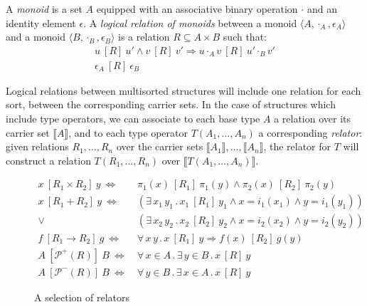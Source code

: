 \documentclass[acmsmall,timestamp,review]{acmart}
\newcommand{\ifr}[1]{\ [{#1}]\ }
\begin{document}
\begin{example}
\label{ex:monoid}
A \emph{monoid} is a set $A$ equipped with
an associative binary operation $\cdot$ and
an identity element $\epsilon$.
A \emph{logical relation of monoids} between
a monoid $\langle A, \cdot_A, \epsilon_A \rangle$ and
a monoid $\langle B, \cdot_B, \epsilon_B \rangle$
is a relation $R \subseteq A \times B$
such that:
\begin{gather*}
u \ifr{R} u' \wedge v \ifr{R} v' \Rightarrow u \cdot_A v \ifr{R} u' \cdot_B v' \\
\epsilon_A \ifr{R} \epsilon_B
\end{gather*}
\end{example}

Logical relations between multisorted structures
will include one relation for each sort,
between the corresponding carrier sets.
In the case of structures which include type operators,
we can associate to each base type $A$
a relation over its carrier set $\llbracket A \rrbracket$,
and to each type operator $T(A_1, \ldots, A_n)$
a corresponding \emph{relator}:
given relations $R_1, \ldots, R_n$ over
the carrier sets $\llbracket A_1 \rrbracket, \ldots, \llbracket A_n \rrbracket$,
the relator for $T$
will construct a relation $T(R_1, \ldots, R_n)$
over $\llbracket T(A_1, \ldots, A_n) \rrbracket$.

\begin{figure} %
  {\small
  \begin{align*}
    x \ifr{R_1 \times R_2} y \ \Leftrightarrow\  &
      \pi_1(x) \ifr{R_1} \pi_1(y) \wedge
      \pi_2(x) \ifr{R_2} \pi_2(y) \\
    x \ifr{R_1 + R_2} y \ \Leftrightarrow\  &
      (\exists \, x_1 \, y_1 \,.\,
        x_1 \ifr{R_1} y_1 \wedge
        x = i_1(x_1) \wedge
        y = i_1(y_1)) \\ \vee\ &
      (\exists \, x_2 \, y_2 \,.\,
        x_2 \ifr{R_2} y_2 \wedge
        x = i_2(x_2) \wedge
        y = i_2(y_2)) \\
    f \ifr{R_1 \rightarrow R_2} g \ \Leftrightarrow\  &
      \forall \, x \, y \,.\,
        x \ifr{R_1} y \Rightarrow
        f(x) \ifr{R_2} g(y) \\
    A \ifr{\mathcal{P}^+(R)} B \ \Leftrightarrow\  &
      \forall \, x \in A \,.\,
      \exists \, y \in B \,.\,
      x \ifr{R} y \\
    A \ifr{\mathcal{P}^-(R)} B \ \Leftrightarrow\  &
      \forall \, y \in B \,.\,
      \exists \, x \in A \,.\,
      x \ifr{R} y
  \end{align*}
  }%
  \caption{A selection of relators}
  \label{fig:relators}
\end{figure}
\end{document}
